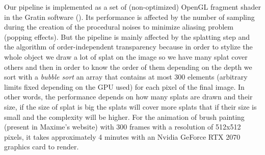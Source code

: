 Our pipeline is implemented as a set of (non-optimized) OpenGL fragment shader in the Gratin software (\cite{vergne:hal-01254546}). Its performance is affected by the number of sampling during the creation of the procedural noises to minimize aliasing problem (popping effects). But the pipeline is mainly affected by the splatting step and the algorithm of order-independent transparency because in order to stylize the whole object we draw a lot of splat on the image so we have many splat cover others and then in order to know the order of them depending on the depth we sort with a \textit{bubble sort} an array that contains at most 300 elements (arbitrary limits fixed depending on the GPU used) for each pixel of the final image. In other words, the performance depends on how many splats are drawn and their size, if the size of splat is big the splats will cover more splats that if their size is small and the complexity will be higher. For the animation of brush painting (present in Maxime's website) with 300 frames with a resolution of 512x512 pixels, it takes approximately 4 minutes with an Nvidia GeForce RTX 2070 graphics card to render.









